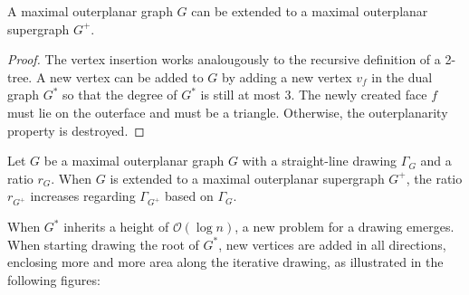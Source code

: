 \begin{lemma}
	A maximal outerplanar graph $G$ can be extended to a maximal outerplanar supergraph $G^+$.\label{l:outerplanar-supergraph}
\end{lemma}
\begin{proof}
	The vertex insertion works analougously to the recursive definition of a 2-tree. A new vertex can be added to $G$ by adding a new vertex $v_f$ in the dual graph $G^*$ so that the degree of $G^*$ is still at most 3. The newly created face $f$ must lie on the outerface and must be a triangle. Otherwise, the outerplanarity property is destroyed. 
\end{proof}

\begin{observation}
	Let $G$ be a maximal outerplanar graph $G$ with a straight-line drawing $\Gamma_G$ and a ratio $r_G$. When $G$ is extended to a maximal outerplanar supergraph $G^+$, the ratio $r_{G^+}$ increases regarding $\Gamma_{G^+}$ based on $\Gamma_G$.\label{ob:area_leads_to_ratio_increase}
\end{observation}
When $G^*$ inherits a height of $\mathcal{O}(\log n)$, a new problem for a drawing emerges. When starting drawing the root of $G^*$, new vertices are added in all directions, enclosing more and more area along the iterative drawing, as illustrated in the following figures:
